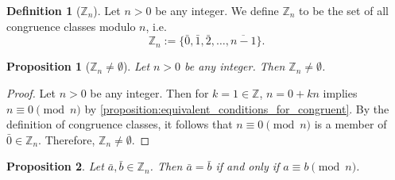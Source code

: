 \documentclass[12pt, titlepage]{amsart}
\newcommand\Z{{\mathbb Z}}
\newcommand\N{{\mathbb N}}
\newtheorem{prop}{Proposition}[subsection]
\theoremstyle{definition}
\newtheorem{definition}{Definition}[subsection]
\begin{document}
	\begin{definition}[$\Z_n$]\label{Definition: Zn}
		Let $n > 0$ be any integer. We define $\Z_n$ to be the set of all congruence classes modulo $n$, i.e. $$ \Z_n := \{ \bar{0}, \bar{1}, \bar{2}, \ldots, \overline{n - 1} \}.$$ %
		
%		
	\end{definition}

	\begin{prop}[$\Z_n \neq \emptyset$]\label{proposition:Zn_is_nonempty}
		Let $n > 0$ be any integer. Then $\Z_n \neq \emptyset$.
	\end{prop}
	
	\begin{proof}
		Let $n > 0$ be any integer.
		Then for $k=1 \in \Z$, $n = 0 + kn$ implies $n \equiv 0 \pmod n$ by \cref{proposition:equivalent_conditions_for_congruent}.
		By the definition of congruence classes, it follows that $n \equiv 0 \pmod n$ is a member of $\bar{0} \in \Z_n$.
		Therefore, $\Z_n \neq \emptyset$.
	\end{proof}
	
	\begin{prop}\label{proposition:equal_congruence_classes}
		Let $\bar{a}, \bar{b} \in \Z_n$.
		Then $\bar{a} = \bar{b}$ if and only if $a \equiv b \pmod n$.
	\end{prop}	
	
\end{document}
